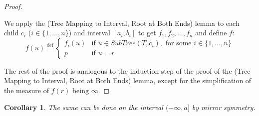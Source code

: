 \documentclass{article}
\newtheorem*{corollary}{Corollary}
\newcommand{\eqdef}{\stackrel{\text{def}}{=}}
\begin{document}
\begin{proof}
\begin{figure}[ht]
  \end{figure}

  We apply the (Tree Mapping to Interval, Root at Both Ends) lemma to each child $c_i$ ($i \in \{1, \dots, n\}$) and interval $[a_i, b_i]$ to get $f_1, f_2, \dots, f_n$ and define $f$:
  \begin{equation*}
    f(u) \eqdef
    \begin{cases}
      f_i(u) & \text{if } u \in SubTree(T, c_i), \text{ for some } i \in \{1, \dots, n\} \\
      p      & \text{if } u = r
    \end{cases}
  \end{equation*}

  The rest of the proof is analogous to the induction step of the proof of the (Tree Mapping to Interval, Root at Both Ends) lemma, except for the simplification of the measure of $f(r)$ being $\infty$.
\end{proof}
\begin{corollary}
The same can be done on the interval $(-\infty, a]$ by mirror symmetry.
\end{corollary}
\end{document}
